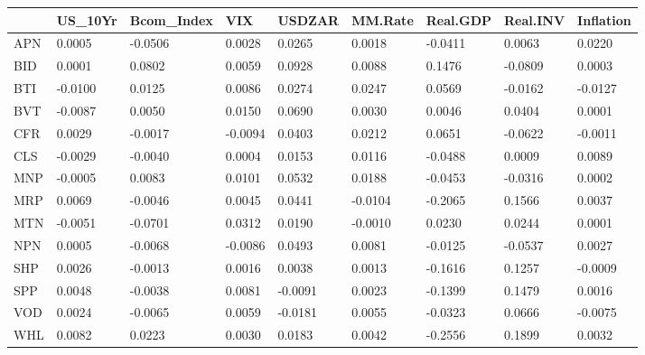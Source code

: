 \documentclass[11pt,preprint, authoryear]{elsarticle}
\let\origtable\table
\let\endorigtable\endtable
\renewenvironment{table}[1][2] {
    \expandafter\origtable\expandafter[H]
} {
    \endorigtable
}
\numberwithin{equation}{section}
\numberwithin{figure}{section}
\numberwithin{table}{section}
\begin{document}
\begin{table}[H]

\caption{\label{tab:Beta_I}Factor Beta's: Industrial}
\centering
\begin{tabular}[t]{l|l|l|l|l|l|l|l|l}
\hline
  & US\_10Yr & Bcom\_Index & VIX & USDZAR & MM.Rate & Real.GDP & Real.INV & Inflation\\
\hline
APN & 0.0005 & -0.0506 & 0.0028 & 0.0265 & 0.0018 & -0.0411 & 0.0063 & 0.0220\\
\hline
BID & 0.0001 & 0.0802 & 0.0059 & 0.0928 & 0.0088 & 0.1476 & -0.0809 & 0.0003\\
\hline
BTI & -0.0100 & 0.0125 & 0.0086 & 0.0274 & 0.0247 & 0.0569 & -0.0162 & -0.0127\\
\hline
BVT & -0.0087 & 0.0050 & 0.0150 & 0.0690 & 0.0030 & 0.0046 & 0.0404 & 0.0001\\
\hline
CFR & 0.0029 & -0.0017 & -0.0094 & 0.0403 & 0.0212 & 0.0651 & -0.0622 & -0.0011\\
\hline
CLS & -0.0029 & -0.0040 & 0.0004 & 0.0153 & 0.0116 & -0.0488 & 0.0009 & 0.0089\\
\hline
MNP & -0.0005 & 0.0083 & 0.0101 & 0.0532 & 0.0188 & -0.0453 & -0.0316 & 0.0002\\
\hline
MRP & 0.0069 & -0.0046 & 0.0045 & 0.0441 & -0.0104 & -0.2065 & 0.1566 & 0.0037\\
\hline
MTN & -0.0051 & -0.0701 & 0.0312 & 0.0190 & -0.0010 & 0.0230 & 0.0244 & 0.0001\\
\hline
NPN & 0.0005 & -0.0068 & -0.0086 & 0.0493 & 0.0081 & -0.0125 & -0.0537 & 0.0027\\
\hline
SHP & 0.0026 & -0.0013 & 0.0016 & 0.0038 & 0.0013 & -0.1616 & 0.1257 & -0.0009\\
\hline
SPP & 0.0048 & -0.0038 & 0.0081 & -0.0091 & 0.0023 & -0.1399 & 0.1479 & 0.0016\\
\hline
VOD & 0.0024 & -0.0065 & 0.0059 & -0.0181 & 0.0055 & -0.0323 & 0.0666 & -0.0075\\
\hline
WHL & 0.0082 & 0.0223 & 0.0030 & 0.0183 & 0.0042 & -0.2556 & 0.1899 & 0.0032\\
\hline
\end{tabular}
\end{table}
\end{document}
